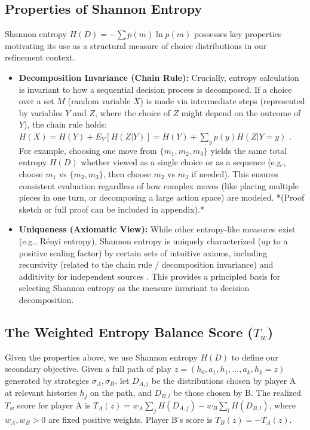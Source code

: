 \documentclass{article}
\begin{document}
\subsection{Properties of Shannon Entropy} \label{sec:entropy_properties}
Shannon entropy $H(D) = - \sum p(m) \ln p(m)$ possesses key properties motivating its use as a structural measure of choice distributions in our refinement context.
\begin{itemize}
    \item \textbf{Decomposition Invariance (Chain Rule):} Crucially, entropy calculation is invariant to how a sequential decision process is decomposed. If a choice over a set $M$ (random variable $X$) is made via intermediate steps (represented by variables $Y$ and $Z$, where the choice of $Z$ might depend on the outcome of $Y$), the chain rule holds: $H(X) = H(Y) + E_Y[H(Z|Y)] = H(Y) + \sum_y p(y) H(Z|Y=y)$ \cite{placeholder_cover_thomas}. For example, choosing one move from $\{m_1, m_2, m_3\}$ yields the same total entropy $H(D)$ whether viewed as a single choice or as a sequence (e.g., choose $m_1$ vs $\{m_2, m_3\}$, then choose $m_2$ vs $m_3$ if needed). This ensures consistent evaluation regardless of how complex moves (like placing multiple pieces in one turn, or decomposing a large action space) are modeled. *(Proof sketch or full proof can be included in appendix).*
    \item \textbf{Uniqueness (Axiomatic View):} While other entropy-like measures exist (e.g., Rényi entropy), Shannon entropy is uniquely characterized (up to a positive scaling factor) by certain sets of intuitive axioms, including recursivity (related to the chain rule / decomposition invariance) and additivity for independent sources \cite{placeholder_shannon_axioms, placeholder_cover_thomas}. This provides a principled basis for selecting Shannon entropy as the measure invariant to decision decomposition.
\end{itemize}

\subsection{The Weighted Entropy Balance Score (\texorpdfstring{$T_w$}{Tw})}
Given the properties above, we use Shannon entropy $H(D)$ to define our secondary objective. Given a full path of play $z = (h_0, a_1, h_1, \dots, a_k, h_k=z)$ generated by strategies $\sigma_A, \sigma_B$, let $D_{A,j}$ be the distributions chosen by player A at relevant histories $h_j$ on the path, and $D_{B,l}$ be those chosen by B. The realized $T_w$ score for player A is $T_A(z) = w_A \sum_j H(D_{A,j}) - w_B \sum_l H(D_{B,l})$, where $w_A, w_B > 0$ are fixed positive weights. Player B's score is $T_B(z) = -T_A(z)$.
\end{document}
